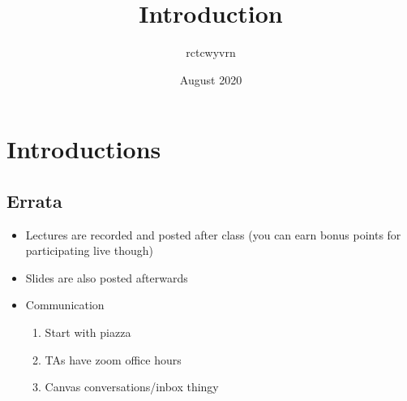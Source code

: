 \documentclass{article}
\title{Introduction}
\author{rctcwyvrn }
\date{August 2020}
\begin{document}
\maketitle
\section{Introductions}
\subsection{Errata}
\begin{itemize}
	\item Lectures are recorded and posted after class (you can earn bonus points for participating live though)
	\item Slides are also posted afterwards
	\item Communication
	\begin{enumerate}
		\item Start with piazza
		\item TAs have zoom office hours
		\item Canvas conversations/inbox thingy
	\end{enumerate}
\end{itemize}
\end{document}
